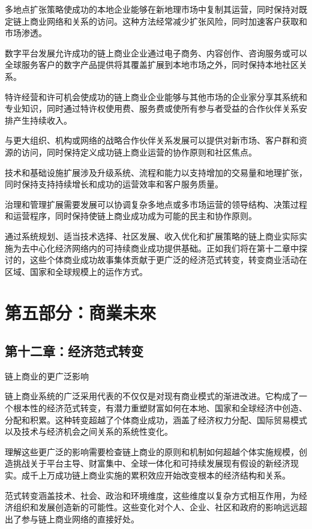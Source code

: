 \documentclass[
  Letterpaper,
]{scrbook}
\begin{document}
多地点扩张策略使成功的本地企业能够在新地理市场中复制其运营，同时保持对既定链上商业网络和关系的访问。这种方法经常减少扩张风险，同时加速客户获取和市场渗透。

数字平台发展允许成功的链上商业企业通过电子商务、内容创作、咨询服务或可以全球服务客户的数字产品提供将其覆盖扩展到本地市场之外，同时保持本地社区关系。

特许经营和许可机会使成功的链上商业企业能够与其他市场的企业家分享其系统和专业知识，同时通过特许权使用费、服务费或使所有参与者受益的合作伙伴关系安排产生持续收入。

与更大组织、机构或网络的战略合作伙伴关系发展可以提供对新市场、客户群和资源的访问，同时保持定义成功链上商业运营的协作原则和社区焦点。

技术和基础设施扩展涉及升级系统、流程和能力以支持增加的交易量和地理扩张，同时保持支持持续增长和成功的运营效率和客户服务质量。

治理和管理扩展需要发展可以协调复杂多地点或多市场运营的领导结构、决策过程和运营程序，同时保持使链上商业成功成为可能的民主和协作原则。

通过系统规划、适当技术选择、社区发展、收入优化和扩展策略的链上商业实际实施为去中心化经济网络内的可持续商业成功提供基础。正如我们将在第十二章中探讨的，这些个体商业成功故事集体贡献于更广泛的经济范式转变，转变商业活动在区域、国家和全球规模上的运作方式。

\part{第五部分：商業未來}

\chapter{第十二章：经济范式转变}\label{sec-paradigm-shift}

链上商业的更广泛影响

链上商业系统的广泛采用代表的不仅仅是对现有商业模式的渐进改进。它构成了一个根本性的经济范式转变，有潜力重塑财富如何在本地、国家和全球经济中创造、分配和积累。这种转变超越了个体商业成功，涵盖了经济权力分配、国际贸易模式以及技术与经济机会之间关系的系统性变化。

理解这些更广泛的影响需要检查链上商业的原则和机制如何超越个体实施规模，创造挑战关于平台主导、财富集中、全球一体化和可持续发展现有假设的新经济现实。成千上万成功链上商业实施的累积效应开始改变根本的经济结构和关系。

范式转变涵盖技术、社会、政治和环境维度，这些维度以复杂方式相互作用，为经济组织和发展创造新的可能性。这些变化对个人、企业、社区和政府的影响远远超出了参与链上商业网络的直接好处。
\end{document}
